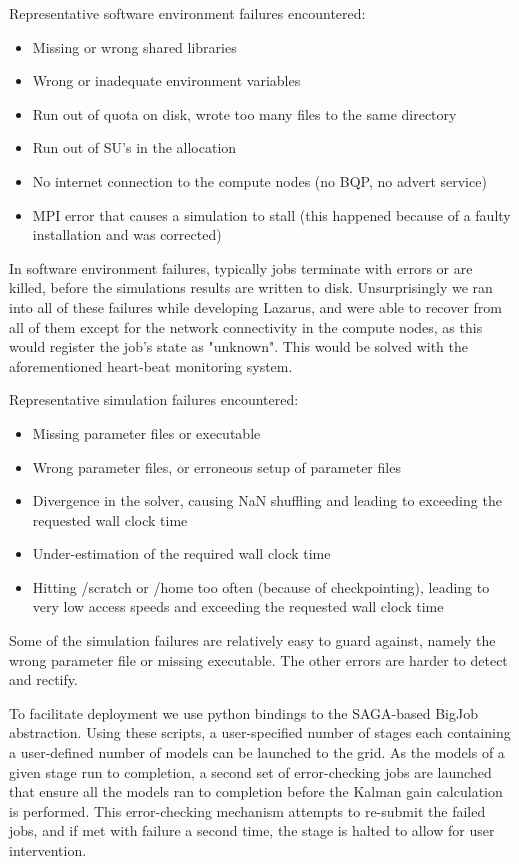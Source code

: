 \documentclass{sig-alternate}
\begin{document}
Representative software environment failures encountered:
\begin{itemize}\addtolength{\itemsep}{-0.8\baselineskip}
\item{Missing or wrong shared libraries}
\item{Wrong or inadequate environment variables}
\item{Run out of quota on disk, wrote too many files to the same directory}
\item{Run out of SU's in the allocation}
\item{No internet connection to the compute nodes (no BQP, no advert service)}
\item{MPI error that causes a simulation to stall (this happened because of a faulty installation and was corrected)}
\end{itemize}
In software environment failures, typically jobs terminate with errors
or are killed, before the simulations results are written to
disk. Unsurprisingly we ran into all of these failures while
developing Lazarus, and were able to recover from all of them except
for the network connectivity in the compute nodes, as this would
register the job's state as "unknown". This would be solved with the
aforementioned heart-beat monitoring system.

Representative simulation failures encountered:
\begin{itemize}\addtolength{\itemsep}{-0.8\baselineskip}
\item{Missing parameter files or executable}
\item{Wrong parameter files, or erroneous setup of parameter files}
\item{Divergence in the solver, causing NaN shuffling and leading to exceeding the requested wall clock time}
\item{Under-estimation of the required wall clock time}
\item{Hitting /scratch or /home too often (because of checkpointing), leading to very low access speeds and exceeding the requested wall clock time}
\end{itemize}
Some of the simulation failures are relatively easy to guard against,
namely the wrong parameter file or missing executable. The other
errors are harder to detect and rectify.

To facilitate deployment we use python bindings to the SAGA-based
BigJob abstraction. Using these scripts, a user-specified number of
stages each containing a user-defined number of models can be launched
to the grid. As the models of a given stage run to completion, a
second set of error-checking jobs are launched that ensure all the
models ran to completion before the Kalman gain calculation is
performed. This error-checking mechanism attempts to re-submit the
failed jobs, and if met with failure a second time, the stage is
halted to allow for user intervention.
\end{document}
